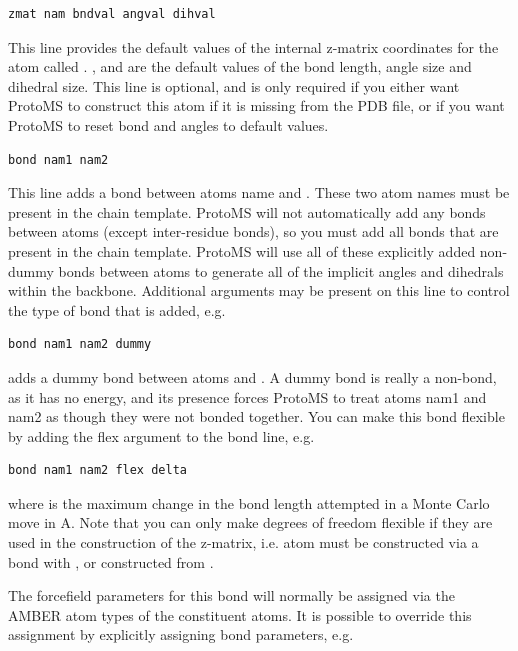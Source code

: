\documentclass[letterpaper,10pt,english]{manual}
\begin{document}
\begin{Verbatim}[commandchars=@\[\]]
zmat nam bndval angval dihval
\end{Verbatim}

This line provides the default values of the internal z-matrix coordinates for the atom called . ,  and  are the default values of the bond length, angle size and dihedral size. This line is optional, and is only required if you either want ProtoMS to construct this atom if it is missing from the PDB file, or if you want ProtoMS to reset bond and angles to default values.

\begin{Verbatim}[commandchars=@\[\]]
bond nam1 nam2
\end{Verbatim}

This line adds a bond between atoms name  and . These two atom names must be present in the chain template. ProtoMS will not automatically add any bonds between atoms (except inter-residue bonds), so you must add all bonds that are present in the chain template. ProtoMS will use all of these explicitly added non-dummy bonds between atoms to generate all of the implicit angles and dihedrals within the backbone. Additional arguments may be present on this line to control the type of bond that is added, e.g.

\begin{Verbatim}[commandchars=@\[\]]
bond nam1 nam2 dummy
\end{Verbatim}

adds a dummy bond between atoms  and . A dummy bond is really a non-bond, as it has no energy, and its presence forces ProtoMS to treat atoms nam1 and nam2 as though they were not bonded together. You can make this bond flexible by adding the flex argument to the bond line, e.g.

\begin{Verbatim}[commandchars=@\[\]]
bond nam1 nam2 flex delta
\end{Verbatim}

where  is the maximum change in the bond length attempted in a Monte Carlo move in A. Note that you can only make degrees of freedom flexible if they are used in the construction of the z-matrix, i.e. atom  must be constructed via a bond with , or  constructed from .

The forcefield parameters for this bond will normally be assigned via the AMBER atom types of the constituent atoms. It is possible to override this assignment by explicitly assigning bond parameters, e.g.
\end{document}
